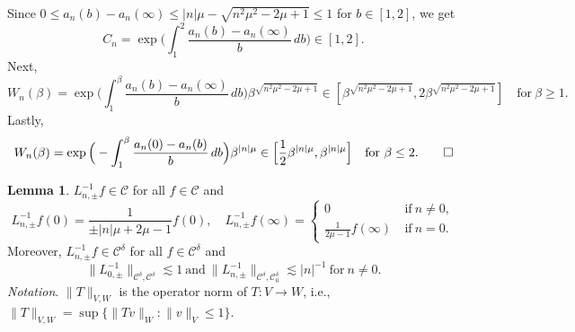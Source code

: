 \documentclass[11pt]{article}
\makeatletter
\renewenvironment{proof}[1][\proofname]{\par
  \vspace{-.7\topsep}%
  \pushQED{\qed}%
  \normalfont
  \topsep0pt \partopsep0pt %
  \trivlist
  \item[\hskip\labelsep
        \itshape
    #1\@addpunct{.}]\ignorespaces
}{%
  \popQED\endtrivlist\@endpefalse
  \addvspace{6pt plus 6pt} %
}
\theoremstyle{definition}
\newtheorem{lemma}[theorem]{Lemma}
\theoremstyle{remark}
\numberwithin{equation}{section}
\newcommand{\mcal}{\mathcal}
\newcommand{\norm}[1]{\lVert #1 \rVert}
\makeatother
\begin{document}
\begin{proof}
Since $0\leq a_n(b) - a_n(\infty) \leq |n|\mu - \sqrt{n^2\mu^2 - 2\mu + 1} \leq 1$ for $b\in [1,2]$, we get
\[C_n = \exp\Big( \int_1^2 \frac{a_n(b) - a_n(\infty)}{b} \,db \Big) \in [1,2].\]
Next,
\[W_n(\beta) = \exp\Big( \int_1^\beta \frac{a_n(b) - a_n(\infty)}{b} \,db \Big) \beta^{\sqrt{n^2\mu^2 - 2\mu + 1}} \in [\beta^{\sqrt{n^2\mu^2 - 2\mu + 1}}, 2\beta^{\sqrt{n^2\mu^2 - 2\mu + 1}}] \quad \text{for}~ \beta\geq 1. \]
Lastly,
\[W_n(\beta) = \exp\Big( -\int_1^\beta \frac{a_n(0) - a_n(b)}{b} \,db \Big) \beta^{|n|\mu} \in \Big[\frac{1}{2} \beta^{|n|\mu}, \beta^{|n|\mu} \Big]\quad\text{for}~ \beta \leq 2 . \qedhere\]
\end{proof}

\begin{lemma} \label{lem:3.6}
$L_{n,\pm}^{-1} f\in \mcal{C}$ for all $f\in\mcal{C}$ and
\begin{equation} \label{eq:3.6}
L_{n,\pm}^{-1} f(0) = \frac{1}{\pm |n|\mu + 2\mu - 1} f(0), \quad L_{n,\pm}^{-1} f(\infty) = \begin{cases} 0 & ~\text{if}~ n \neq 0, \\ \frac{1}{2\mu - 1} f(\infty) &~\text{if}~n=0. \end{cases}
\end{equation}
Moreover, $L_{n,\pm}^{-1} f \in \mcal{C}^\delta$ for all $f\in \mcal{C}^\delta$ and
\begin{equation} \label{eq:3.7}
\norm{L_{0,\pm}^{-1}}_{\mcal{C}^\delta, \mcal{C}^\delta} \lesssim 1 ~\text{and}~ \norm{L_{n,\pm}^{-1}}_{\mcal{C}^\delta,\mcal{C}^\delta_0} \lesssim |n|^{-1} ~\text{for}~n\neq 0.
\end{equation}
\textit{Notation}. $\norm{T}_{V,W}$ is the operator norm of $T:V\to W$, i.e., $\norm{T}_{V,W} = \sup \{\norm{Tv}_{W} : \norm{v}_V\leq 1\}$.
\end{lemma}
\end{document}
